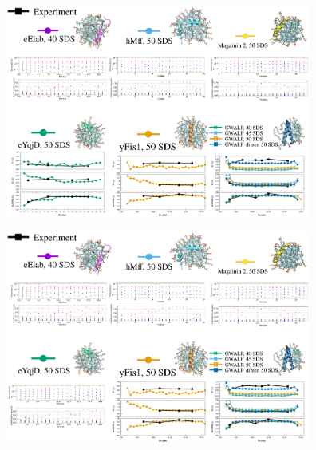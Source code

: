 \documentclass{beamer}
\begin{document}
\addtocounter{framenumber}{-1}
\begin{frame}
\begin{center}


\vspace{0.5cm}


\includegraphics[height=7cm]{all_pep11.pdf}
\end{center}
\end{frame}


\addtocounter{framenumber}{-1}
\begin{frame}
\begin{center}


\vspace{0.5cm}


\includegraphics[height=7cm]{all_pep12.pdf}
\end{center}
\end{frame}
\end{document}
